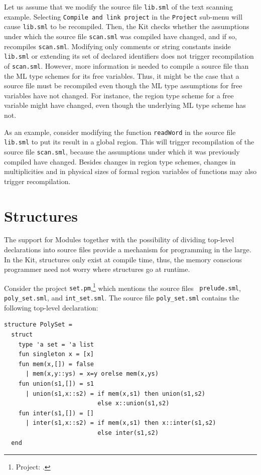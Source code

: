 \documentclass[12pt]{book}
\begin{document}
Let us assume that we modify the source file {\tt lib.sml} of the
text scanning example.  Selecting {\tt Compile and link project} in
the {\tt Project} sub-menu will cause {\tt lib.sml} to be recompiled.
Then, the Kit checks whether the assumptions under which the source
file {\tt scan.sml} was compiled have changed, and if so, recompiles
{\tt scan.sml}.  Modifying only comments or string constants inside
{\tt lib.sml} or extending its set of declared identifiers does not
trigger recompilation of {\tt scan.sml}.  However, more information is
needed to compile a source file than the ML type schemes for its free
variables. Thus, it might be the case that a source file must be
recompiled even though the ML type assumptions for free variables have
not changed. For instance, the region type scheme for a free variable
might have changed, even though the underlying ML type scheme has not.

As an example, consider modifying the function {\tt readWord} in the
source file {\tt lib.sml} to put its result in a global region. This
will trigger recompilation of the source file {\tt scan.sml}, because
the assumptions under which it was previously compiled have
changed. Besides changes in region type schemes, changes in
multiplicities and in physical sizes of formal region variables of
functions may also trigger recompilation.


\section{Structures}
The support for Modules together with the possibility of dividing top-level
declarations into source files provide a mechanism for
programming in the large. In the Kit, structures only exist at compile
time, thus, the memory conscious programmer need not worry where
structures go at runtime.

Consider the project {\tt set.pm},\footnote{Project:
  .} which mentions the source files {\tt
  prelude.sml}, {\tt poly\_set.sml}, and {\tt int\_set.sml}. The source
  file {\tt poly\_set.sml} contains the following top-level
  declaration:
\begin{verbatim}
structure PolySet = 
  struct
    type 'a set = 'a list
    fun singleton x = [x]
    fun mem(x,[]) = false
      | mem(x,y::ys) = x=y orelse mem(x,ys)
    fun union(s1,[]) = s1
      | union(s1,x::s2) = if mem(x,s1) then union(s1,s2)
                          else x::union(s1,s2)  
    fun inter(s1,[]) = []
      | inter(s1,x::s2) = if mem(x,s1) then x::inter(s1,s2)
                          else inter(s1,s2)
  end
\end{verbatim}
\end{document}
